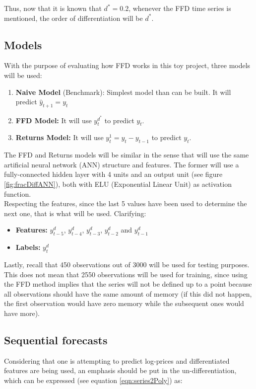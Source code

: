 \documentclass[a4paper]{article}
\begin{document}
Thus, now that it is known that $d^* = 0.2$, whenever the FFD time series is 
mentioned, the order of differentiation will be $d^*$.

\subsection{Models}
With the purpose of evaluating how FFD works in this toy project, three 
models will be used:

\begin{enumerate}
	\item \textbf{Naive Model} (Benchmark): Simplest model than can be 
	built. It will predict $\widehat{y}_{t+1} = y_t$
	\item \textbf{FFD Model:} It will use $y_t^{d^*}$ to predict $y_t$.
	\item \textbf{Returns Model:} It will use $y_t^{1} = y_t - y_{t-1}$ to 
	predict $y_t$.
\end{enumerate}

The FFD and Returns models will be similar in the sense that will use the 
same artificial neural network (ANN) structure and features. The former will 
use a fully-connected hidden layer with 4 units and an output unit (see 
figure \ref{fig:fracDiffANN}), both 
with ELU (Exponential Linear Unit) as activation function.\\

Respecting the features, since the last 5 values have been used to determine 
the next one, that is what will be used. Clarifying:

\begin{itemize}
	\item \textbf{Features:} $y_{t-5}^d$, $y_{t-4}^d$, $y_{t-3}^d$, 
	$y_{t-2}^d$ and $y_{t-1}^d$
	\item \textbf{Labels:} $y_{t}^d$
\end{itemize}

Lastly, recall that 450 observations out of 3000 will be used for testing 
purposes. This does not mean that 2550 observations will be used for 
training, since using the FFD method implies that the series will not be 
defined up to a point because all observations should have the same amount 
of memory (if this did not happen, the first observation would have zero 
memory while the subsequent ones would have more).

\subsection{Sequential forecasts}
\label{sec:toyProjectSeqForecast}
Considering that one is attempting to predict log-prices and differentiated 
features are being used, an emphasis should be put in the 
un-differentiation, which can be expressed (see equation
\ref{eqn:series2Poly}) as:
\end{document}
